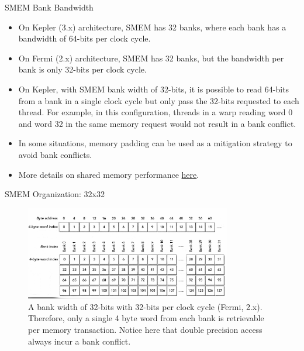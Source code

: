\documentclass[handout]{beamer}
\begin{document}
\begin{frame}{SMEM Bank Bandwidth}
\begin{itemize}
\itemsep1em
	\item<1->On Kepler (3.x) architecture, SMEM has 32 banks, where each bank has a bandwidth of 64-bits per clock cycle. 
	\item<1->On Fermi  (2.x) architecture, SMEM has 32 banks, but the bandwidth per bank is only 32-bits per clock cycle. 
	\item<1->On Kepler, with SMEM bank width of 32-bits, it is possible to read 64-bits from a bank in a single clock cycle but only pass the 32-bits requested to each thread.  For example, in this configuration, threads in a warp reading word 0 and word 32 in the same memory request would not result in a bank conflict.
	\item<1->In some situations, memory padding can be used as a mitigation strategy to avoid bank conflicts.
	\item<1->More details on shared memory performance \href{http://on-demand.gputechconf.com/gtc-express/2011/videos/sharedmemoryusage_july2011.mp4}{\color{blue}here}.
\end{itemize}
\end{frame}

\begin{frame}{SMEM Organization: 32x32}
\begin{figure}
\begin{center}
\includegraphics[width=9cm]{../media/banks32.pdf}
\caption{A bank width of 32-bits with 32-bits per clock cycle (Fermi, 2.x).  Therefore, only a single 4 byte word from each bank is retrievable per memory transaction.  Notice here that double precision access always incur a bank conflict.}
\end{center}
\end{figure}
\end{frame}
\end{document}
